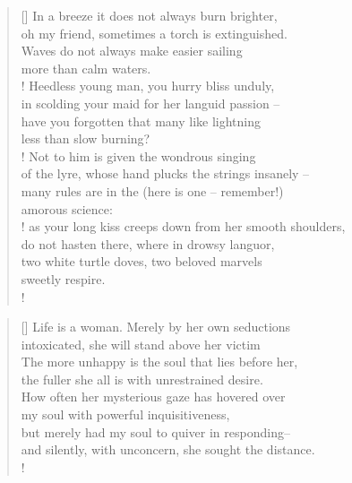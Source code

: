 \documentclass[]{article}
\newcommand{\poemauthorcenter}[1]{\nopagebreak{\centering\footnotesize\textsc{#1}\par}}
\begin{document}
\settowidth{\versewidth}{ In a breeze it does not always burn brighter}
\begin{verse}[\versewidth]
In a breeze it does not always burn brighter,\\
oh my friend, sometimes a torch is extinguished.\\
Waves do not always make easier sailing\\
more than calm waters.\\!
Heedless young man, you hurry bliss unduly,\\
in scolding your maid for her languid passion --\\
have you forgotten that many like lightning \\
less than slow burning?\\!
Not to him is given the wondrous singing\\
of the lyre, whose hand plucks the strings insanely -- \\
many rules are in the (here is one -- remember!)\\
amorous science:\\!
as your long kiss creeps down from her smooth shoulders,\\
do not hasten there, where in drowsy languor,\\
two white turtle doves, two beloved marvels\\
sweetly respire.\\!
\end{verse}
\poemauthorcenter{\textit{1922}}
\bigskip \bigskip \bigskip

\settowidth{\versewidth}{Life is a woman. Merely by her own seductions}
\begin{verse}[\versewidth]
Life is a woman. Merely by her own seductions\\
intoxicated, she will stand above her victim\\
The more unhappy is the soul that lies before her,\\
the fuller she all is with unrestrained desire.\\
How often her mysterious gaze has hovered over\\
my soul with powerful inquisitiveness,\\
but merely had my soul to quiver in responding-- \\
and silently, with unconcern, she sought the distance.\\!
\end{verse}
\newpage
\end{document}
